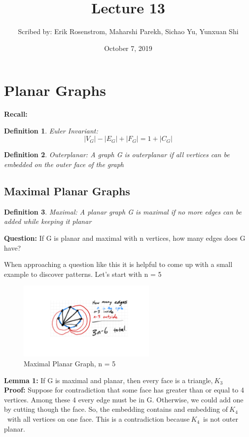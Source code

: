 \documentclass{article}
\title{Lecture 13}
\author{Scribed by: Erik Rosenstrom, Maharshi Parekh, Sichao Yu, Yunxuan Shi }
\date{October 7, 2019}
\begin{document}
\newtheorem{definition}{Definition}
\maketitle


\section{Planar Graphs}
\textbf{Recall:}

\begin{definition}{Euler Invariant: } 
$$|V_G| - |E_G| + |F_G| = 1 + |C_G|$$

\end{definition}
\begin{definition}{Outerplanar: }
A graph G is outerplanar if all vertices can be embedded on the outer face of the graph
\end{definition}

\subsection{Maximal Planar Graphs}
\begin{definition}{Maximal: }
A planar graph G is maximal if no more edges can be added while keeping it planar
\end{definition}


\textbf{Question:} If G is planar and maximal with n vertices, how many edges does G have?

When approaching a question like this it is helpful to come up with a small example to discover patterns. Let's start with n = 5

\begin{figure}[h!]
\centering
\includegraphics[width=0.6\textwidth]{"gt 1"}
\caption{Maximal Planar Graph, n = 5}
\end{figure}


\textbf{Lemma 1: }If G is maximal and planar, then every face is a triangle,$\ {K_3}$\\
\textbf{Proof:} Suppose for contradiction that some face has greater than or equal to 4 vertices. Among these 4 every edge must be in G. Otherwise, we could add one by cutting though the face. So, the embedding contains and embedding of$\ {K_4}$\ with all vertices on one face. This is a contradiction because$\ {K_4}$\ is not outer planar.\\
\end{document}
